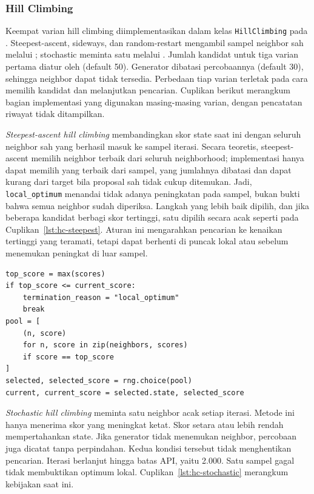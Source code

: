 \documentclass[12pt,a4paper]{article}
\begin{document}
\subsubsection{Hill Climbing}
Keempat varian hill climbing diimplementasikan dalam kelas \texttt{HillClimbing} pada . Steepest-ascent, sideways, dan random-restart mengambil sampel neighbor sah melalui ; stochastic meminta satu melalui . Jumlah kandidat untuk tiga varian pertama diatur oleh  (default 50). Generator dibatasi percobaannya (default 30), sehingga neighbor dapat tidak tersedia. Perbedaan tiap varian terletak pada cara memilih kandidat dan melanjutkan pencarian. Cuplikan berikut merangkum bagian implementasi yang digunakan masing-masing varian, dengan pencatatan riwayat tidak ditampilkan.

\textit{Steepest-ascent hill climbing} membandingkan skor state saat ini dengan seluruh neighbor sah yang berhasil masuk ke sampel iterasi. Secara teoretis, steepest-ascent memilih neighbor terbaik dari seluruh neighborhood; implementasi hanya dapat memilih yang terbaik dari sampel, yang jumlahnya dibatasi dan dapat kurang dari target bila proposal sah tidak cukup ditemukan. Jadi, \texttt{local\_optimum} menandai tidak adanya peningkatan pada sampel, bukan bukti bahwa semua neighbor sudah diperiksa. Langkah yang lebih baik dipilih, dan jika beberapa kandidat berbagi skor tertinggi, satu dipilih secara acak seperti pada Cuplikan~\ref{lst:hc-steepest}. Aturan ini mengarahkan pencarian ke kenaikan tertinggi yang teramati, tetapi dapat berhenti di puncak lokal atau sebelum menemukan peningkat di luar sampel.

\begin{lstlisting}[emph={top_score,current_score,pool,rng},caption={Inti pemilihan neighbor pada steepest-ascent},label={lst:hc-steepest}]
top_score = max(scores)
if top_score <= current_score:
    termination_reason = "local_optimum"
    break
pool = [
    (n, score)
    for n, score in zip(neighbors, scores)
    if score == top_score
]
selected, selected_score = rng.choice(pool)
current, current_score = selected.state, selected_score
\end{lstlisting}

\textit{Stochastic hill climbing} meminta satu neighbor acak setiap iterasi. Metode ini hanya menerima skor yang meningkat ketat. Skor setara atau lebih rendah mempertahankan state. Jika generator tidak menemukan neighbor, percobaan juga dicatat tanpa perpindahan. Kedua kondisi tersebut tidak menghentikan pencarian. Iterasi berlanjut hingga batas API, yaitu 2.000. Satu sampel gagal tidak membuktikan optimum lokal. Cuplikan~\ref{lst:hc-stochastic} merangkum kebijakan saat ini.
\end{document}
